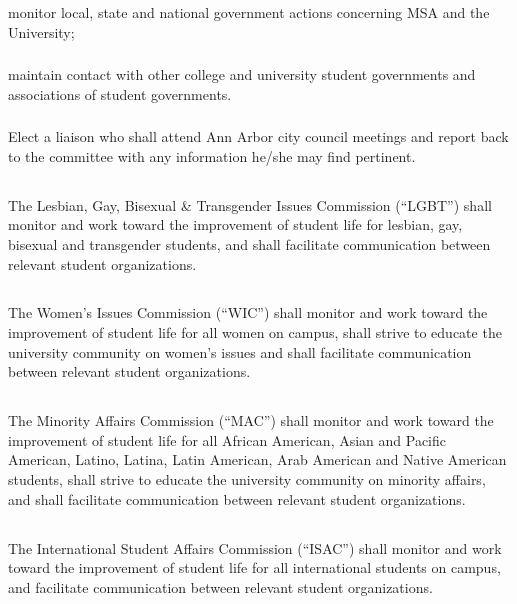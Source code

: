 \subsubsection{}
monitor local, state and national government actions concerning MSA and the University;
\subsubsection{}
maintain contact with other college and university student governments and associations of student governments.
\subsubsection{}
Elect a liaison who shall attend Ann Arbor city council meetings and report back to the committee with any information he/she may find pertinent.

\subsection{}
The Lesbian, Gay, Bisexual \& Transgender Issues Commission (``LGBT'') shall monitor and work toward the improvement of student life for lesbian, gay, bisexual and transgender students, and shall facilitate communication between relevant student organizations.

\subsection{}
The Women's Issues Commission (``WIC'') shall monitor and work toward the improvement of student life for all women on campus, shall strive to educate the university community on women's issues and shall facilitate communication between relevant student organizations.

\subsection{}
The Minority Affairs Commission (``MAC'') shall monitor and work toward the improvement of student life for all African American, Asian and Pacific American, Latino, Latina, Latin American, Arab American and Native American students, shall strive to educate the university community on minority affairs, and shall facilitate communication between relevant student organizations.

\subsection{}
The International Student Affairs Commission (``ISAC'') shall monitor and work toward the improvement of student life for all international students on campus, and facilitate communication between relevant student organizations.

